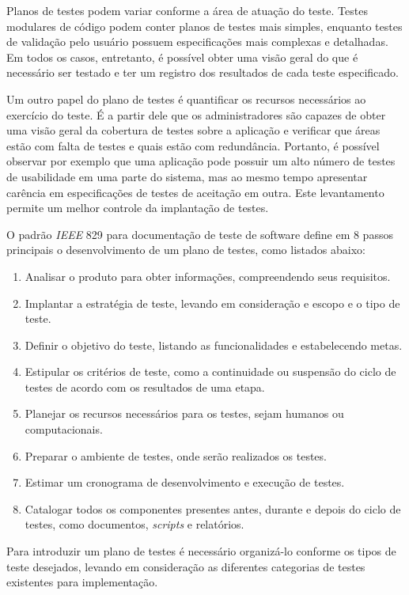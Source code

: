 Planos de testes podem variar conforme a área de atuação do teste. Testes modulares de código podem conter planos de testes mais simples, enquanto testes de validação pelo usuário possuem especificações mais complexas e detalhadas. Em todos os casos, entretanto, é possível obter uma visão geral do que é necessário ser testado e ter um registro dos resultados de cada teste especificado.

Um outro papel do plano de testes é quantificar os recursos necessários ao exercício do teste. É a partir dele que os administradores são capazes de obter uma visão geral da cobertura de testes sobre a aplicação e verificar que áreas estão com falta de testes e quais estão com redundância. Portanto, é possível observar por exemplo que uma aplicação pode possuir um alto número de testes de usabilidade em uma parte do sistema, mas ao mesmo tempo apresentar carência em especificações de testes de aceitação em outra. Este levantamento permite um melhor controle da implantação de testes.

O padrão \emph{IEEE} 829 \cite{software2008ieee} para documentação de teste de software define em 8 passos principais o desenvolvimento de um plano de testes, como listados abaixo:
\begin{enumerate}
    \item Analisar o produto para obter informações, compreendendo seus requisitos.
    \item Implantar a estratégia de teste, levando em consideração e escopo e o tipo de teste.
    \item Definir o objetivo do teste, listando as funcionalidades e estabelecendo metas.
    \item Estipular os critérios de teste, como a continuidade ou suspensão do ciclo de testes de acordo com os resultados de uma etapa.
    \item Planejar os recursos necessários para os testes, sejam humanos ou computacionais.
    \item Preparar o ambiente de testes, onde serão realizados os testes.
    \item Estimar um cronograma de desenvolvimento e execução de testes.
    \item Catalogar todos os componentes presentes antes, durante e depois do ciclo de testes, como documentos, \emph{scripts} e relatórios.
\end{enumerate}

Para introduzir um plano de testes é necessário organizá-lo conforme os tipos de teste desejados, levando em consideração as diferentes categorias de testes existentes para implementação.


